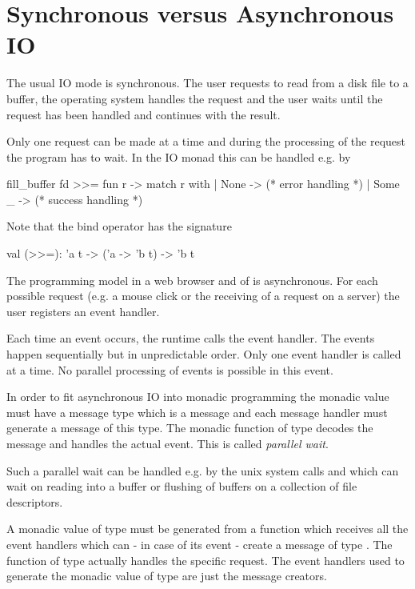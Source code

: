 \section{Synchronous versus Asynchronous IO}

The usual IO mode is synchronous. The user requests to read from a disk file
to a buffer, the operating system handles the request and the user waits
until the request has been handled and continues with the result.

Only one request can be made at a time and during the processing of the
request the program has to wait. In the IO monad this can be handled e.g. by
%
\begin{ocaml}
  fill_buffer fd >>= fun r ->
  match r with
  | None ->
    (* error handling *)
  | Some _ ->
    (* success handling *)
\end{ocaml}
%
Note that the bind operator has the signature
%
\begin{ocaml}
  val (>>=): 'a t -> ('a -> 'b t) -> 'b t
\end{ocaml}


The programming model in a web browser and of  is
asynchronous. For each possible request (e.g. a mouse click or the receiving
of a request on a server) the user registers an event handler.

Each time an event occurs, the runtime calls the event handler. The events
happen sequentially but in unpredictable order. Only one event handler is
called at a time. No parallel processing of events is possible in this event.

In order to fit asynchronous IO into monadic programming the monadic value
 must have a message type  which is a message and each
message handler must generate a message of this type. The monadic function of
type  decodes the message and handles the actual event. This
is called \emph{parallel wait}.

Such a parallel wait can be handled e.g. by the unix system calls
 and  which can wait on reading into a buffer or
flushing of buffers on a collection of file descriptors.

A monadic value of type  must be generated from a function which
receives all the event handlers which can - in case of its event - create a
message of type . The function of type  actually
handles the specific request. The event handlers used to generate the monadic
value of type   are just the message creators.

